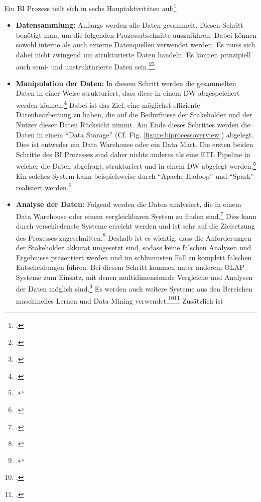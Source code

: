Ein \ac{BI} Prozess teilt sich in sechs Hauptaktivitäten auf:\footcite[Cf.][Fig. 2]{foley2010business}
\begin{itemize}
    \item \textbf{Datensammlung: }Anfangs werden alle Daten gesammelt. Diesen Schritt benötigt man, um die folgenden
    Prozessabschnitte auszuführen. Dabei können sowohl interne als auch externe Datenquellen verwendet werden. Es muss sich
    dabei nicht zwingend um strukturierte Daten handeln. Es können prinzipiell auch semi- und unstrukturierte Daten
    sein.\footcite[Cf.][p. 465]{ranjan2008business}\footcite[Cf.][p. 3]{hartmann2016capturing}
    \item \textbf{Manipulation der Daten: }In diesem Schritt werden die gesammelten Daten in einer Weise strukturiert, dass
    diese in einem \ac{DW} abgespeichert werden können.\footcite[Cf.][p. 463]{ranjan2008business} Dabei ist das Ziel, eine
    möglichst effiziente Datenbearbeitung zu haben, die auf die Bedürfnisse der Stakeholder und der Nutzer dieser Daten Rücksicht
    nimmt. Am Ende dieses Schrittes werden die Daten in einem "`Data Storage"' (Cf. Fig. \ref{figure:biprocessoverview}) abgelegt.
    Dies ist entweder ein Data Warehouse oder ein Data Mart. Die ersten beiden Schritte des \ac{BI} Prozesses sind daher nichts
    anderes als eine \ac{ETL} Pipeline in welcher die Daten abgefragt, strukturiert und in einem \ac{DW} abgelegt
    werden.\footcite[Cf.][p. 466]{ranjan2008business} Ein solches System kann beispielsweise durch "`Apache Hadoop"' und
    "`Spark"' realisiert werden.\footcite[Cf.][p. 65]{rahman2015big}
    \item \textbf{Analyse der Daten: }Folgend werden die Daten analysiert, die in einem Data Warehouse oder einem vergleichbaren
    System zu finden sind.\footcite[Cf.][p. 16]{kasemsap2016fundamentals} Dies kann durch verschiedenste Systeme erreicht werden
    und ist sehr auf die Zielsetzung des Prozesses zugeschnitten.\footcite[Cf.][p. 21]{niu2009cognition} Deshalb ist es wichtig,
    dass die Anforderungen der Stakeholder akkurat umgesetzt sind, sodass keine falschen Analysen und Ergebnisse präsentiert
    werden und im schlimmsten Fall zu komplett falschen Entscheidungen führen. Bei diesem Schritt kommen unter anderem \ac{OLAP}
    Systeme zum Einsatz, mit denen multidimensionale Vergleiche und Analysen der Daten möglich
    sind.\footcite[Cf.][p. 107ff]{hovcevar2010assessing} Es werden auch weitere Systeme aus den Bereichen maschinelles Lernen
    und Data Mining verwendet.\footcite[Cf.][p. 11]{foley2010business}\footcite[Cf.][p. 80]{yeoh2008managing} Zusätzlich ist

\end{itemize}

